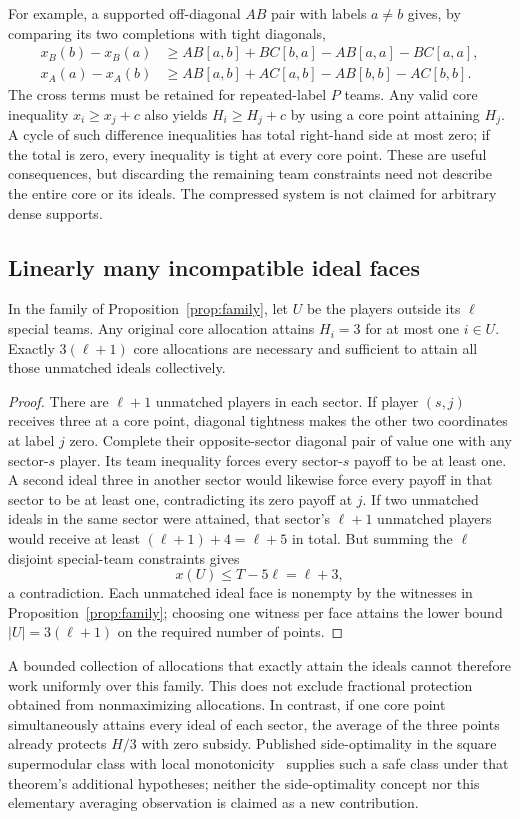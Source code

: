 For example, a supported off-diagonal $AB$ pair with labels $a\ne b$
gives, by comparing its two completions with tight diagonals,
\begin{align*}
 x_B(b)-x_B(a)&\ge AB[a,b]+BC[b,a]-AB[a,a]-BC[a,a],\\
 x_A(a)-x_A(b)&\ge AB[a,b]+AC[a,b]-AB[b,b]-AC[b,b].
\end{align*}
The cross terms must be retained for repeated-label $P$ teams. Any valid
core inequality $x_i\ge x_j+c$ also yields $H_i\ge H_j+c$ by using
a core point attaining $H_j$. A cycle of such difference inequalities
has total right-hand side at most zero; if the total is zero, every
inequality is tight at every core point. These are useful consequences,
but discarding the remaining team constraints need not describe the
entire core or its ideals. The compressed system is not claimed for
arbitrary dense supports.

\subsection{Linearly many incompatible ideal faces}
\begin{proposition}\label{anc:attainment}
In the family of Proposition~\ref{prop:family}, let $U$ be the players
outside its $\ell$ special teams. Any original core allocation attains
$H_i=3$ for at most one $i\in U$. Exactly $3(\ell+1)$ core allocations
are necessary and sufficient to attain all those unmatched ideals
collectively.
\end{proposition}
\begin{proof}
There are $\ell+1$ unmatched players in each sector. If player $(s,j)$
receives three at a core point, diagonal tightness makes the other two
coordinates at label $j$ zero. Complete their opposite-sector diagonal
pair of value one with any sector-$s$ player. Its team inequality forces
every sector-$s$ payoff to be at least one.
A second ideal three in another sector would likewise force every
payoff in that sector to be at least one, contradicting its zero payoff
at $j$. If two unmatched ideals in the same sector were attained, that
sector's $\ell+1$ unmatched players would receive at least
$(\ell+1)+4=\ell+5$ in total. But summing the $\ell$ disjoint
special-team constraints gives
\[
                  x(U)\le T-5\ell=\ell+3,
\]
a contradiction. Each unmatched ideal face is nonempty by the witnesses
in Proposition~\ref{prop:family}; choosing one witness per face attains
the lower bound $|U|=3(\ell+1)$ on the required number of points.
\end{proof}
A bounded collection of allocations that exactly attain the ideals
cannot therefore work uniformly over this family. This does not exclude
fractional protection obtained from nonmaximizing allocations. In
contrast, if one core point simultaneously attains every ideal of each
sector, the average of the three points already protects $H/3$ with
zero subsidy. Published side-optimality in the square supermodular class
with local monotonicity~\cite[Theorem~3.2]{Martinez2026} supplies such a
safe class under that theorem's additional hypotheses; neither the
side-optimality concept nor this elementary averaging observation is
claimed as a new contribution.

